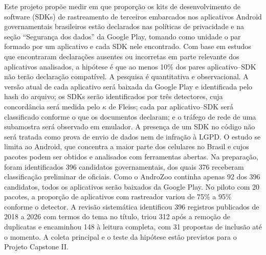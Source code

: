 Este projeto propõe medir em que proporção os kits de desenvolvimento de software (SDKs) de rastreamento de terceiros embarcados nos aplicativos Android governamentais brasileiros estão declarados nas políticas de privacidade e na seção ``Segurança dos dados'' da Google Play, tomando como unidade o par formado por um aplicativo e cada SDK nele encontrado. Com base em estudos que encontraram declarações ausentes ou incorretas em parte relevante dos aplicativos analisados, a hipótese é que ao menos 10\% dos pares aplicativo--SDK não terão declaração compatível. A pesquisa é quantitativa e observacional. A versão atual de cada aplicativo será baixada da Google Play e identificada pelo hash do arquivo; os SDKs serão identificados por três detectores, cuja concordância será medida pelo $\kappa$ de Fleiss; cada par aplicativo--SDK será classificado conforme o que os documentos declaram; e o tráfego de rede de uma subamostra será observado em emulador. A presença de um SDK no código não será tratada como prova de envio de dados nem de infração à LGPD. O estudo se limita ao Android, que concentra a maior parte dos celulares no Brasil e cujos pacotes podem ser obtidos e analisados com ferramentas abertas. Na preparação, foram identificados 396 candidatos governamentais, dos quais 376 receberam classificação preliminar de oficiais. Como o AndroZoo continha apenas 92 dos 396 candidatos, todos os aplicativos serão baixados da Google Play. No piloto com 20 pacotes, a proporção de aplicativos com rastreador variou de 75\% a 95\% conforme o detector. A revisão sistemática identificou 396 registros publicados de 2018 a 2026 com termos do tema no título, triou 312 após a remoção de duplicatas e encaminhou 148 à leitura completa, com 31 propostas de inclusão até o momento. A coleta principal e o teste da hipótese estão previstos para o Projeto Capstone II.
